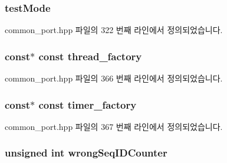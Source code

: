 \subsubsection[{\texorpdfstring{test\+Mode}{testMode}}]{ test\+Mode\hspace{0.3cm}{\ttfamily [private]}}\hypertarget{class_common_port_a4ca1649b0fc050ca483e5dd8996ac80d}{}\label{class_common_port_a4ca1649b0fc050ca483e5dd8996ac80d}


common\+\_\+port.\+hpp 파일의 322 번째 라인에서 정의되었습니다.

\subsubsection[{\texorpdfstring{thread\+\_\+factory}{thread_factory}}]{ const$\ast$ const thread\+\_\+factory\hspace{0.3cm}{\ttfamily [protected]}}\hypertarget{class_common_port_a2268fc1f22a57c22f52a6cd1a2d2c609}{}\label{class_common_port_a2268fc1f22a57c22f52a6cd1a2d2c609}


common\+\_\+port.\+hpp 파일의 366 번째 라인에서 정의되었습니다.

\subsubsection[{\texorpdfstring{timer\+\_\+factory}{timer_factory}}]{ const$\ast$ const timer\+\_\+factory\hspace{0.3cm}{\ttfamily [protected]}}\hypertarget{class_common_port_a0603401af06940a9018688e0030e68e5}{}\label{class_common_port_a0603401af06940a9018688e0030e68e5}


common\+\_\+port.\+hpp 파일의 367 번째 라인에서 정의되었습니다.

\subsubsection[{\texorpdfstring{wrong\+Seq\+I\+D\+Counter}{wrongSeqIDCounter}}]{\setlength{\rightskip}{0pt plus 5cm}unsigned int wrong\+Seq\+I\+D\+Counter\hspace{0.3cm}{\ttfamily [private]}}\hypertarget{class_common_port_abd149bb94f90455cf47e7223a892772a}{}\label{class_common_port_abd149bb94f90455cf47e7223a892772a}


